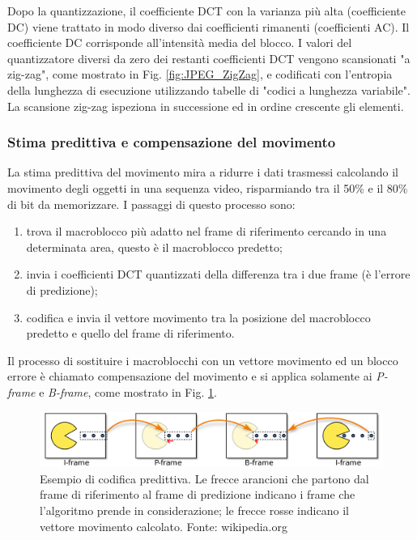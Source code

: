 Dopo la quantizzazione, il coefficiente DCT con la varianza più alta (coefficiente DC) viene trattato in modo diverso dai coefficienti rimanenti (coefficienti AC). Il coefficiente DC corrisponde all'intensità media del blocco. I valori del quantizzatore diversi da zero dei restanti coefficienti DCT vengono scansionati "a zig-zag", come mostrato in Fig. \ref{fig:JPEG_ZigZag}, e codificati con l'entropia della lunghezza di esecuzione utilizzando tabelle di "codici a lunghezza variabile". La scansione zig-zag ispeziona in successione ed in ordine crescente gli elementi.



\subsubsection{Stima predittiva e compensazione del movimento}
La stima predittiva del movimento mira a ridurre i dati trasmessi calcolando il movimento degli oggetti in una sequenza video, risparmiando tra il 50\% e il 80\% di bit da memorizzare. I passaggi di questo processo sono:

\begin{enumerate}
	\item trova il macroblocco più adatto nel frame di riferimento cercando in una determinata area, questo è il macroblocco predetto;
	\item invia i coefficienti DCT quantizzati della differenza tra i due frame (è l'errore di predizione);
	\item codifica e invia il vettore movimento tra la posizione del macroblocco predetto e quello del frame di riferimento.
\end{enumerate}

Il processo di sostituire i macroblocchi con un vettore movimento ed un blocco errore è chiamato compensazione del movimento e si applica solamente ai \textit{P-frame} e \textit{B-frame}, come mostrato in Fig. \ref{fig:I_P_and_B_frames}.

\begin{figure}[H]
	\includegraphics[width=\linewidth]{immagini/I_P_and_B_frames}
	\caption{Esempio di codifica predittiva. Le frecce arancioni che partono dal frame di riferimento al frame di predizione indicano i frame che l'algoritmo prende in considerazione; le frecce rosse indicano il vettore movimento calcolato. Fonte: wikipedia.org}
	\label{fig:I_P_and_B_frames}
\end{figure}


